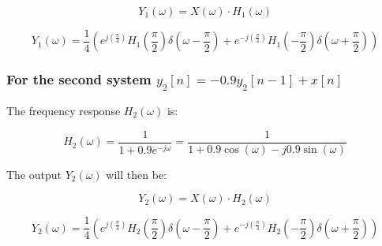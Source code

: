 \begin{equation*}
Y_1(\omega) = X(\omega) \cdot H_1(\omega)
\end{equation*}

\begin{equation*}
    Y_{1}(\omega)=\frac{1}{4}\left(e^{j\left(\frac{\pi}{4}\right)} H_{1}\left(\frac{\pi}{2}\right) \delta\left(\omega-\frac{\pi}{2}\right)+e^{-j\left(\frac{\pi}{4}\right)} H_{1}\left(-\frac{\pi}{2}\right) \delta\left(\omega+\frac{\pi}{2}\right)\right) 
\end{equation*}


\subsubsection*{For the second system $ y_2[n] = -0.9y_2[n-1] + x[n] $}

The frequency response $ H_2(\omega) $ is:

\begin{equation*}
H_2(\omega) = \frac{1}{1 + 0.9 e^{-j\omega}} = \frac{1}{1 + 0.9 \cos(\omega) - j0.9 \sin(\omega)}
\end{equation*}

The output $ Y_2(\omega) $ will then be:

\begin{equation*}
Y_2(\omega) = X(\omega) \cdot H_2(\omega)
\end{equation*}

\begin{equation*}
    Y_{2}(\omega)=\frac{1}{4}\left(e^{j\left(\frac{\pi}{4}\right)} H_{2}\left(\frac{\pi}{2}\right) \delta\left(\omega-\frac{\pi}{2}\right)+e^{-j\left(\frac{\pi}{4}\right)} H_{2}\left(-\frac{\pi}{2}\right) \delta\left(\omega+\frac{\pi}{2}\right)\right) 
\end{equation*}
